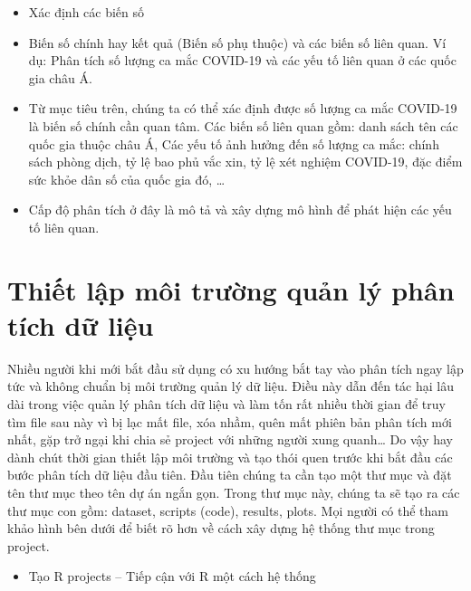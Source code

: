 \documentclass[
]{book}
\providecommand{\tightlist}{%
  \setlength{\itemsep}{0pt}\setlength{\parskip}{0pt}}
\theoremstyle{definition}
\theoremstyle{definition}
\theoremstyle{definition}
\theoremstyle{definition}
\theoremstyle{remark}
\begin{document}
\begin{itemize}
\item
  Xác định các biến số
\item
  Biến số chính hay kết quả (Biến số phụ thuộc) và các biến số liên quan. Ví dụ: Phân tích số lượng ca mắc COVID-19 và các yếu tố liên quan ở các quốc gia châu Á.
\item
  Từ mục tiêu trên, chúng ta có thể xác định được số lượng ca mắc COVID-19 là biến số chính cần quan tâm. Các biến số liên quan gồm: danh sách tên các quốc gia thuộc châu Á, Các yếu tố ảnh hưởng đến số lượng ca mắc: chính sách phòng dịch, tỷ lệ bao phủ vắc xin, tỷ lệ xét nghiệm COVID-19, đặc điểm sức khỏe dân số của quốc gia đó, \ldots{}
\item
  Cấp độ phân tích ở đây là mô tả và xây dựng mô hình để phát hiện các yếu tố liên quan.
\end{itemize}

\hypertarget{thiux1ebft-lux1eadp-muxf4i-trux1b0ux1eddng-quux1ea3n-luxfd-phuxe2n-tuxedch-dux1eef-liux1ec7u}{%
\section{Thiết lập môi trường quản lý phân tích dữ liệu}\label{thiux1ebft-lux1eadp-muxf4i-trux1b0ux1eddng-quux1ea3n-luxfd-phuxe2n-tuxedch-dux1eef-liux1ec7u}}

Nhiều người khi mới bắt đầu sử dụng có xu hướng bắt tay vào phân tích ngay lập tức và không chuẩn bị môi trường quản lý dữ liệu. Điều này dẫn đến tác hại lâu dài trong việc quản lý phân tích dữ liệu và làm tốn rất nhiều thời gian để truy tìm file sau này vì bị lạc mất file, xóa nhầm, quên mất phiên bản phân tích mới nhất, gặp trở ngại khi chia sẻ project với những người xung quanh\ldots{} Do vậy hay dành chút thời gian thiết lập môi trường và tạo thói quen trước khi bắt đầu các bước phân tích dữ liệu đầu tiên. Đầu tiên chúng ta cần tạo một thư mục và đặt tên thư mục theo tên dự án ngắn gọn. Trong thư mục này, chúng ta sẽ tạo ra các thư mục con gồm: dataset, scripts (code), results, plots. Mọi người có thể tham khảo hình bên dưới để biết rõ hơn về cách xây dựng hệ thống thư mục trong project.

\begin{itemize}
\tightlist
\item
  Tạo R projects -- Tiếp cận với R một cách hệ thống
\end{itemize}
\end{document}
